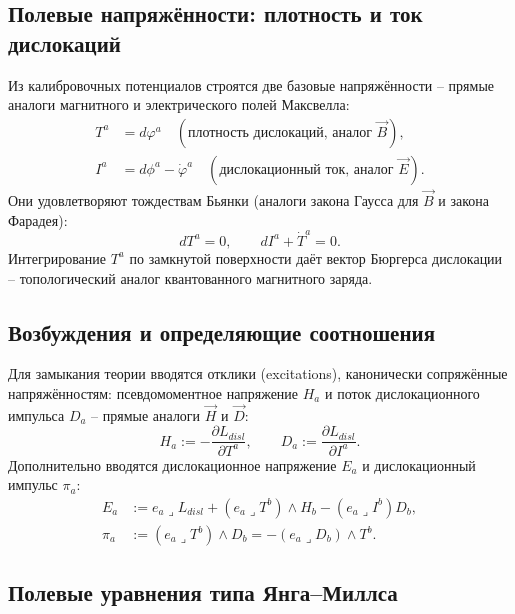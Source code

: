 \documentclass[12pt,a4paper]{article}
\begin{document}
\subsection{Полевые напряжённости: плотность и ток дислокаций}

Из калибровочных потенциалов строятся две базовые напряжённости --
прямые аналоги магнитного и электрического полей Максвелла:
\begin{align}
T^a &= d\varphi^a \quad(\text{плотность дислокаций, аналог } \vec B),\\
I^a &= d\phi^a-\dot\varphi^a \quad(\text{дислокационный ток, аналог } \vec E).
\end{align}
Они удовлетворяют тождествам Бьянки (аналоги закона Гаусса для $\vec B$
и закона Фарадея):
\begin{equation}
dT^a=0,\qquad dI^a+\dot T^a=0.
\end{equation}
Интегрирование $T^a$ по замкнутой поверхности даёт вектор Бюргерса
дислокации -- топологический аналог квантованного магнитного заряда.

\subsection{Возбуждения и определяющие соотношения}

Для замыкания теории вводятся отклики (excitations), канонически
сопряжённые напряжённостям: псевдомоментное напряжение $H_a$ и поток
дислокационного импульса $D_a$ -- прямые аналоги $\vec H$ и $\vec D$:
\begin{equation}
H_a := -\frac{\partial L_{disl}}{\partial T^a},\qquad
D_a := \frac{\partial L_{disl}}{\partial I^a}.
\end{equation}
Дополнительно вводятся дислокационное напряжение $E_a$ и
дислокационный импульс $\pi_a$:
\begin{align}
E_a &:= e_a\lrcorner L_{disl} + (e_a\lrcorner T^b)\wedge H_b
- (e_a\lrcorner I^b) D_b,\\
\pi_a &:= (e_a\lrcorner T^b)\wedge D_b = -(e_a\lrcorner D_b)\wedge T^b.
\end{align}

\subsection{Полевые уравнения типа Янга--Миллса}
\end{document}

